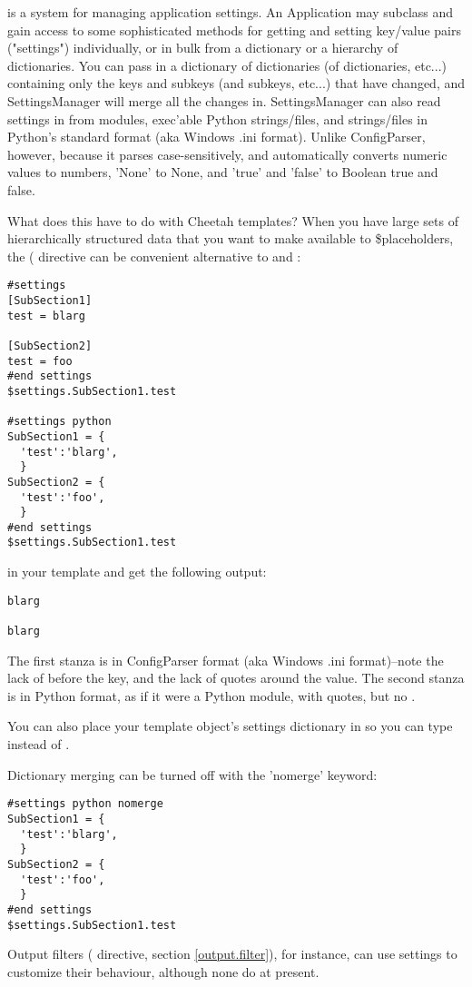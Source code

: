  is a system for managing application settings.  An
Application may subclass  and gain access
to some sophisticated methods for getting and setting key/value pairs
("settings") individually, or in bulk from a dictionary or a hierarchy of
dictionaries.  You can pass in a dictionary of dictionaries (of dictionaries,
etc...) containing only the keys and subkeys (and subkeys, etc...) that have
changed, and SettingsManager will merge all the changes in.  SettingsManager can
also read settings in from modules, exec'able Python strings/files, and
strings/files in Python's standard  format (aka Windows .ini
format).  Unlike ConfigParser, however, because it parses case-sensitively, and
automatically converts numeric values to numbers, 'None' to None, and 'true' and
'false' to Boolean true and false.

What does this have to do with Cheetah templates? When you have large sets of
hierarchically structured data that you want to make available to
\$placeholders, the ( directive can be convenient
alternative to  and :

\begin{verbatim}
#settings
[SubSection1]
test = blarg

[SubSection2]
test = foo
#end settings
$settings.SubSection1.test

#settings python
SubSection1 = {
  'test':'blarg',
  }
SubSection2 = {
  'test':'foo',
  }
#end settings
$settings.SubSection1.test
\end{verbatim}

in your template and get the following output:

\begin{verbatim}
blarg

blarg
\end{verbatim}

The first stanza is in ConfigParser format (aka Windows .ini format)--note the
lack of \code{\$} before the key, and the lack of quotes around the value.  The
second stanza is in Python format, as if it were a Python module, with quotes,
but no \code{\$}.

You can also place your template object's settings dictionary in  so you can type  instead of
.

Dictionary merging can be turned off with the 'nomerge' keyword:

\begin{verbatim}
#settings python nomerge
SubSection1 = {
  'test':'blarg',
  }
SubSection2 = {
  'test':'foo',
  }
#end settings
$settings.SubSection1.test
\end{verbatim}

Output filters ( directive, section \ref{output.filter}),
for instance, can use settings to customize their behaviour, although none
do at present.

